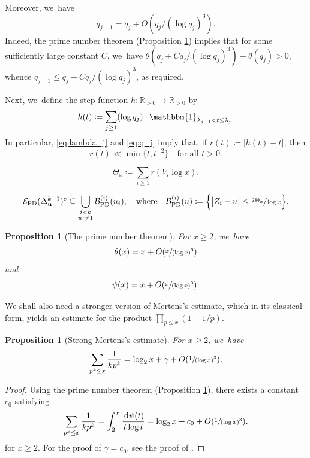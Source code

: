 \documentclass[10pt,a4paper]{article}
\newcommand{\bigO}[1]{O(#1)}
\newcommand{\RR}{\mathbb{R}}
\newcommand{\dee}{\,\mathrm{d}}
\newcommand{\one}{\mathbbm{1}}
\newcommand{\EC}{\mathcal{E}}
\newcommand{\simplex}{\Delta^{k-1}}
\newcommand{\bg}{\big}
\newcommand{\bgg}{\Big}
\newcommand{\ECprob}{\EC_{\mathrm{PD}}}
\newcommand{\Bprob}{\mathcal{B}_{\mathrm{PD}}}
\theoremstyle{plain}
\newtheorem{prop}[cor]{Proposition}
\theoremstyle{definition}
\begin{document}
Moreover, we~have
\begin{equation}
\label{eq:q_j}
q_{j+1} = q_j+O(q_j/(\log q_j)^3).
\end{equation}
Indeed, the prime number theorem (Proposition \ref{pnt}) implies that for some sufficiently large constant $C$, we~have $\theta(q_j+Cq_j/(\log q_j)^3) -\theta(q_j)>0$, whence $q_{j+1}\le q_j+Cq_j/(\log q_j)^3$, as required.

Next, we~define the step-function $h:\RR_{>0} \to \RR_{>0}$ by
\begin{equation}
\label{eq:h(t) dfn}
h(t) \coloneqq \sum_{j \ge 1} (\log q_j) \cdot \one_{\lambda_{j-1} < t \le \lambda_j}.
\end{equation}
In particular, \eqref{eq:lambda_j} and \eqref{eq:q_j} imply that, if $r(t) \coloneqq |h(t) - t|$, then
\begin{equation}
\label{eq:h(t) estimate}
r(t) \ll \min\{t, t^{-2}\} \quad \text{for all $t > 0$.}
\end{equation}

\begin{equation}
\label{eq:def of Theta_x}
\Theta_x \coloneqq \sum_{i \ge 1} r(V_i\log x).
\end{equation}

\[
\ECprob(\simplex_{\mathbf{u}})^c\subseteq \bigcup_{\substack{i< k \\ u_i\neq 1}} \Bprob^{(i)}(u_i),
\quad\text{where}\quad
\Bprob^{(i)}(u) \coloneqq \bgg\{ \bg| Z_i - u \bg|\le \sfrac{2\Theta_x}{\log x} \bgg\},
\]

\begin{prop}[The prime number theorem]
\label{pnt}
For $x \ge 2$, we~have
\[
\theta(x) = x + \bigO{\sfrac{x}{(\log x)^3}}
\]
and
\[
\psi(x) = x+\bigO{\sfrac{x}{(\log x)^3}}.
\]
\end{prop}

We shall also need a stronger version of Mertens's estimate, which in its classical form, yields an estimate for the product $\prod_{p \le x} (1-1/p)$.

\begin{prop}[Strong Mertens's estimate]
\label{prop:mertens}
For $x \ge 2$, we~have
\[
\sum_{p^k \le x} \frac{1}{kp^k} = \log_2 x + \gamma + \bigO{\sfrac{1}{(\log x)^3}}.
\]
\end{prop}

\begin{proof}
Using the prime number theorem (Proposition \ref{pnt}), there exists a constant $c_0$ satisfying
\[
\sum_{p^k \le x} \frac{1}{kp^k} = \int_{2^-}^x \frac{\dee \psi(t)}{t\log t} = \log_2 x + c_0 + \bigO{\sfrac{1}{(\log x)^3}}.
\]
for $x \ge 2$. For the proof of $\gamma = c_0$, see the proof of \cite[Th.\,2.7]{MV07}.
\end{proof}
\end{document}
